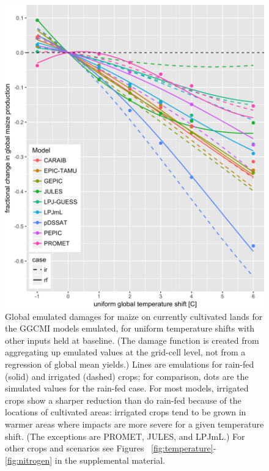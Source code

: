 \documentclass[preprint, 5p, times, twocolumn]{elsarticle}
\begin{document}
\begin{figure}[!htb]
    \centering
    \includegraphics[width=0.95\linewidth]{global_em_maize.png}
    \caption{Global emulated damages for maize on currently cultivated lands for the GGCMI models emulated, for uniform temperature shifts with other inputs held at baseline. (The damage function is created from aggregating up emulated values at the grid-cell level, not from a regression of global mean yields.) Lines are emulations for rain-fed (solid) and irrigated (dashed) crops; for comparison, dots are the simulated values for the rain-fed case.  For most models, irrigated crops show a sharper reduction than do rain-fed because of the locations of cultivated areas: irrigated crops tend to be grown in warmer areas where impacts are more severe for a given temperature shift. (The exceptions are PROMET, JULES, and LPJmL.) For other crops and scenarios see Figures ~\ref{fig:temperature}- \ref{fig:nitrogen} in the supplemental material.}
    \label{fig:globe_em}
\end{figure}
\end{document}
